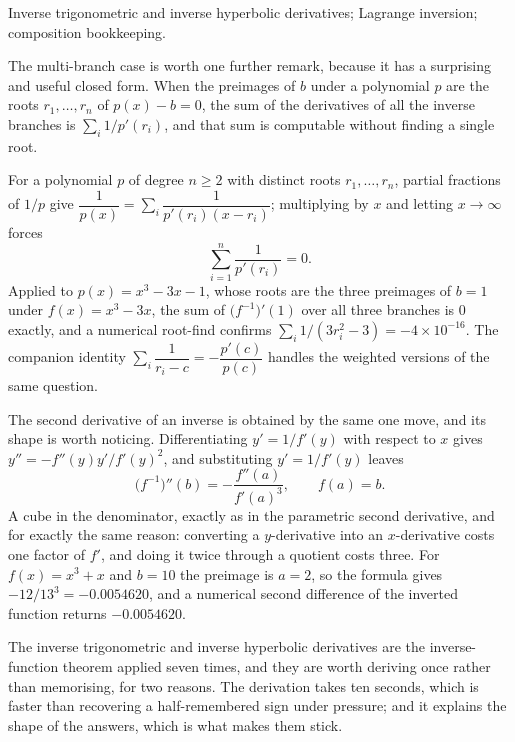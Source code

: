 \begin{seealsob}Inverse trigonometric and inverse hyperbolic derivatives; Lagrange inversion; composition bookkeeping.\end{seealsob}

The multi-branch case is worth one further remark, because it has a surprising and useful closed form. When the preimages of $b$ under a polynomial $p$ are the roots $r_{1},\dots,r_{n}$ of $p(x)-b=0$, the sum of the derivatives of all the inverse branches is $\sum_{i}1/p'(r_{i})$, and that sum is computable without finding a single root.

\begin{keynote}
For a polynomial $p$ of degree $n\geq2$ with distinct roots $r_{1},\dots,r_{n}$, partial fractions of $1/p$ give $\dfrac{1}{p(x)}=\sum_{i}\dfrac{1}{p'(r_{i})(x-r_{i})}$; multiplying by $x$ and letting $x\to\infty$ forces
\[
\sum_{i=1}^{n}\frac{1}{p'(r_{i})}=0 .
\]
Applied to $p(x)=x^{3}-3x-1$, whose roots are the three preimages of $b=1$ under $f(x)=x^{3}-3x$, the sum of $\bigl(f^{-1}\bigr)'(1)$ over all three branches is $0$ exactly, and a numerical root-find confirms $\sum_{i}1/(3r_{i}^{2}-3)=-4\times10^{-16}$. The companion identity $\sum_{i}\dfrac{1}{r_{i}-c}=-\dfrac{p'(c)}{p(c)}$ handles the weighted versions of the same question.
\end{keynote}

The second derivative of an inverse is obtained by the same one move, and its shape is worth noticing. Differentiating $y'=1/f'(y)$ with respect to $x$ gives $y''=-f''(y)y'/f'(y)^{2}$, and substituting $y'=1/f'(y)$ leaves
\[
\bigl(f^{-1}\bigr)''(b)=-\frac{f''(a)}{f'(a)^{3}},\qquad f(a)=b .
\]
A cube in the denominator, exactly as in the parametric second derivative, and for exactly the same reason: converting a $y$-derivative into an $x$-derivative costs one factor of $f'$, and doing it twice through a quotient costs three. For $f(x)=x^{3}+x$ and $b=10$ the preimage is $a=2$, so the formula gives $-12/13^{3}=-0.0054620$, and a numerical second difference of the inverted function returns $-0.0054620$.

The inverse trigonometric and inverse hyperbolic derivatives are the inverse-function theorem applied seven times, and they are worth deriving once rather than memorising, for two reasons. The derivation takes ten seconds, which is faster than recovering a half-remembered sign under pressure; and it explains the shape of the answers, which is what makes them stick.

